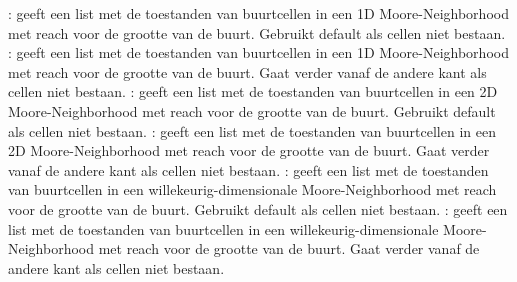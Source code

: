 {}: geeft een list met de toestanden van buurtcellen in een 1D Moore-Neighborhood met reach voor de grootte van de buurt. Gebruikt default als cellen niet bestaan.\markdownRendererInterblockSeparator
{}: geeft een list met de toestanden van buurtcellen in een 1D Moore-Neighborhood met reach voor de grootte van de buurt. Gaat verder vanaf de andere kant als cellen niet bestaan.\markdownRendererInterblockSeparator
{}: geeft een list met de toestanden van buurtcellen in een 2D Moore-Neighborhood met reach voor de grootte van de buurt. Gebruikt default als cellen niet bestaan.\markdownRendererInterblockSeparator
{}: geeft een list met de toestanden van buurtcellen in een 2D Moore-Neighborhood met reach voor de grootte van de buurt. Gaat verder vanaf de andere kant als cellen niet bestaan.\markdownRendererInterblockSeparator
{}: geeft een list met de toestanden van buurtcellen in een willekeurig-dimensionale Moore-Neighborhood met reach voor de grootte van de buurt. Gebruikt default als cellen niet bestaan.\markdownRendererInterblockSeparator
{}: geeft een list met de toestanden van buurtcellen in een willekeurig-dimensionale Moore-Neighborhood met reach voor de grootte van de buurt. Gaat verder vanaf de andere kant als cellen niet bestaan.\markdownRendererDocumentEnd